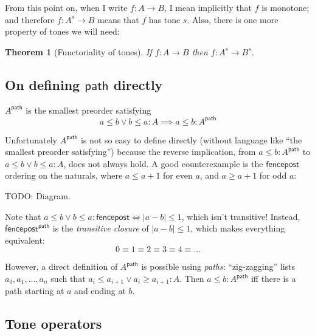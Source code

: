 \documentclass{rntznotes}
\newtheorem{theorem}{Theorem}
\newcommand{\todo}[1]{{\color{red}#1}}
\newcommand{\ms}[1]{\ensuremath{\mathsf{#1}}}
\renewcommand{\path}{\ms{path}}
\begin{document}
From this point on, when I write $f : A \to B$, I mean implicitly that $f$ is
monotone; and therefore $f : A^s \to B$ means that $f$ has tone $s$.
%
Also, there is one more property of tones we will need:

\begin{theorem}[Functoriality of tones]\label{thm:tone-functoriality}
  If $f : A \to B$ then $f : A^s \to B^s$.
\end{theorem}


\subsection{On defining \ms{path} directly} \label{sec:defining-path}

$A^\path$ is the smallest preorder satisfying
\[ a \le b \vee b \le a : A \implies a \le b : A^\path \]

Unfortunately $A^\path$ is not so easy to define directly (without
language like ``the smallest preorder satisfying'')
%
because the reverse implication, from $a \le b : A^\path$ to $a \le b \vee b \le
a : A$, does not always hold. A good counterexample is the \ms{fencepost}
ordering on the naturals, where $a \le a+1$ for even $a$, and $a \ge a+1$ for
odd $a$:

\todo{TODO: Diagram}.

Note that $a \le b \vee b \le a : \ms{fencepost} \iff |a-b| \le 1$, which isn't
transitive! Instead, $\ms{fencepost}^\path$ is the \emph{transitive closure} of
$|a-b| \le 1$, which makes everything equivalent:
\[ 0 \equiv 1 \equiv 2 \equiv 3 \equiv 4 \equiv ... \]

However, a direct definition of $A^\path$ is possible using \emph{paths}:
``zig-zagging'' lists $a_0, a_1, ..., a_n$ such that $a_i \le a_{i+1} \vee a_i
\ge a_{i+1} : A$. Then $a \le b : A^\path$ iff there is a path starting at $a$
and ending at $b$.


\subsection{Tone operators}
\end{document}
